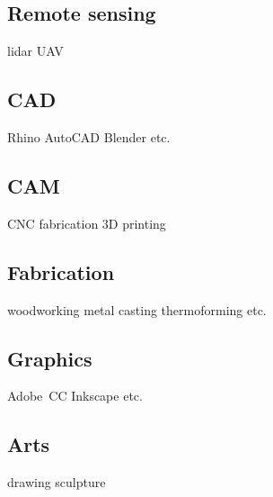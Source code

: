 \documentclass[]{baharmon-cv}
\begin{document}
{{{{{{\begin{minipage}[t]{0.3\textwidth}
\subsection{Remote sensing}
\vspace*{0.1cm}
lidar \textbullet{} UAV \\ 
\linespread{0.1}
\end{minipage} 
%
\hfill
%
\begin{minipage}[t]{0.33\textwidth} 
\subsection{CAD}
\vspace*{0.1cm}
Rhino \textbullet{} AutoCAD \textbullet{} Blender \textbullet{} etc. \\ 
\linespread{0.1}
%
\subsection{CAM}
\vspace*{0.1cm}
CNC fabrication \textbullet{} 3D printing \\ 
\linespread{0.1}
%
\subsection{Fabrication}
\vspace*{0.1cm}
woodworking \textbullet{} metal casting \textbullet{} thermoforming \textbullet{} etc. \\ 
\linespread{0.1}
\end{minipage} 
%
\hfill
%
\begin{minipage}[t]{0.2\textwidth} 
\subsection{Graphics}
\vspace*{0.1cm}
Adobe~CC \textbullet{} Inkscape \textbullet{} etc. \\ 
\linespread{0.1}
%
\subsection{Arts}
\vspace*{0.1cm}
drawing \textbullet{} sculpture \\ 
\linespread{0.1}
\end{minipage} 
%
\\
}

}}}}}
\end{document}
